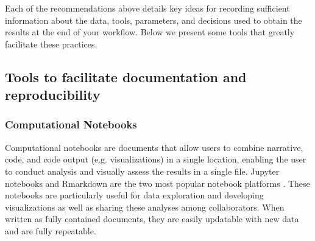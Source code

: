 \documentclass[10pt,letterpaper]{article}
\begin{document}
Each of the recommendations above details key ideas for recording sufficient information about the data, tools, parameters, and decisions used to obtain the results at the end of your workflow. 
Below we present some tools that greatly facilitate these practices.
 


\subsection*{Tools to facilitate documentation and reproducibility}

\subsubsection*{Computational Notebooks} 

Computational notebooks are documents that allow users to combine narrative, code, and code output (e.g. visualizations) in a single location, enabling the user to conduct analysis and visually assess the results in a single file.
Jupyter notebooks and Rmarkdown are the two most popular notebook platforms \cite{kluyver2016jupyter, allaire2018rmarkdown}. 
These notebooks are particularly useful for data exploration and developing visualizations as well as sharing these analyses among collaborators. 
When written as fully contained documents, they are easily updatable with new data and are fully repeatable. 
\end{document}
